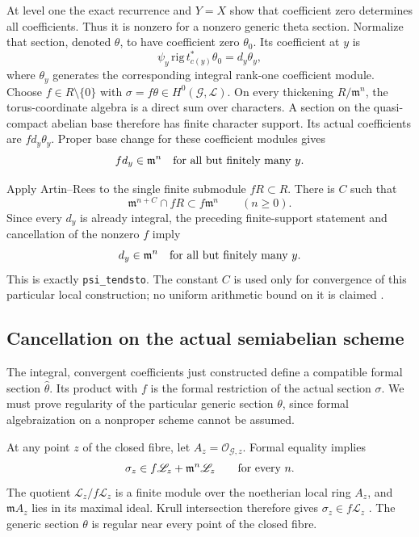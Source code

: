 At level one the exact recurrence and $Y=X$ show that coefficient
zero determines all coefficients.  Thus it is nonzero for a
nonzero generic theta section.  Normalize that section, denoted
$\theta$, to have coefficient zero $\theta_0$.  Its coefficient
at $y$ is
\[
        \psi_y\,\mathrm{rig}\,t_{c(y)}^*\theta_0
                        = d_y\theta_y,
\]
where $\theta_y$ generates the corresponding integral rank-one
coefficient module.  Choose $f\in R\setminus\{0\}$ with
$\sigma=f\theta\in H^0(\mathcal G,\mathscr L)$.
On every thickening $R/\mathfrak m^n$, the torus-coordinate
algebra is a direct sum over characters.  A section on the
quasi-compact abelian base therefore has finite character support.
Its actual coefficients are $fd_y\theta_y$.  Proper base change
for these coefficient modules gives
\[
       fd_y\in\mathfrak m^n
                 \quad\hbox{for all but finitely many }y.
\]

Apply Artin--Rees to the single finite submodule $fR\subset R$.
There is $C$ such that
\[
          \mathfrak m^{n+C}\cap fR\subset f\mathfrak m^n
                      \qquad(n\geq0).
\]
Since every $d_y$ is already integral, the preceding finite-support
statement and cancellation of the nonzero $f$ imply
\[
              d_y\in\mathfrak m^n
                    \quad\hbox{for all but finitely many }y.
\]
This is exactly \texttt{psi\_tendsto}.  The constant $C$ is used
only for convergence of this particular local construction; no
uniform arithmetic bound on it is claimed
\cite[Tag 00IN]{integral-theta-stacks}.

\subsection*{Cancellation on the actual semiabelian scheme}

The integral, convergent coefficients just constructed define a
compatible formal section $\widehat\theta$.  Its product with $f$
is the formal restriction of the actual section $\sigma$.
We must prove regularity of the particular generic section
$\theta$, since formal algebraization on a nonproper scheme
cannot be assumed.

At any point $z$ of the closed fibre, let
$A_z=\mathcal O_{\mathcal G,z}$.  Formal equality implies
\[
 \sigma_z\in f\mathscr L_z+\mathfrak m^n\mathscr L_z
                       \qquad\hbox{for every }n.
\]
The quotient $\mathscr L_z/f\mathscr L_z$ is a finite module over
the noetherian local ring $A_z$, and
$\mathfrak m A_z$ lies in its maximal ideal.  Krull intersection
therefore gives $\sigma_z\in f\mathscr L_z$
\cite[Tag 00IP]{integral-theta-stacks}.  The generic section
$\theta$ is regular near every point of the closed fibre.

